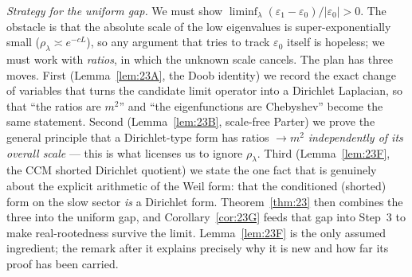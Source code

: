 \documentclass[11pt]{amsart}
\theoremstyle{definition}
\theoremstyle{remark}
\newcommand{\ve}{\varepsilon}
\begin{document}
\emph{Strategy for the uniform gap.} We must show $\liminf_\lambda(\ve_1-\ve_0)/|\ve_0|>0$. The
obstacle is that the absolute scale of the low eigenvalues is super-exponentially small
($\rho_\lambda\asymp e^{-cL}$), so any argument that tries to track $\ve_0$ itself is hopeless;
we must work with \emph{ratios}, in which the unknown scale cancels. The plan has three moves.
First (Lemma~\ref{lem:23A}, the Doob identity) we record the exact change of variables that
turns the candidate limit operator into a Dirichlet Laplacian, so that ``the ratios are
$m^2$'' and ``the eigenfunctions are Chebyshev'' become the same statement. Second
(Lemma~\ref{lem:23B}, scale-free Parter) we prove the general principle that a Dirichlet-type
form has ratios $\to m^2$ \emph{independently of its overall scale} --- this is what licenses us
to ignore $\rho_\lambda$. Third (Lemma~\ref{lem:23F}, the CCM shorted Dirichlet quotient) we
state the one fact that is genuinely about the explicit arithmetic of the Weil form: that the
conditioned (shorted) form on the slow sector \emph{is} a Dirichlet form. Theorem~\ref{thm:23}
then combines the three into the uniform gap, and Corollary~\ref{cor:23G} feeds that gap into
Step~3 to make real-rootedness survive the limit. Lemma~\ref{lem:23F} is the only assumed
ingredient; the remark after it explains precisely why it is new and how far its proof has been
carried.
\end{document}
